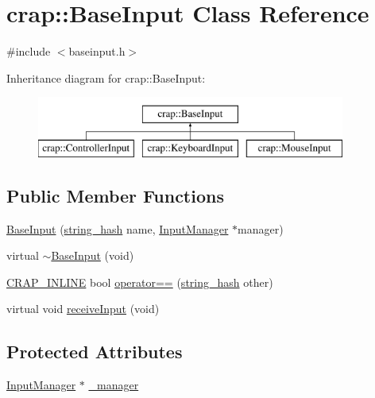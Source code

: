 \hypertarget{classcrap_1_1_base_input}{}\section{crap\+:\+:Base\+Input Class Reference}
\label{classcrap_1_1_base_input}


{\ttfamily \#include $<$baseinput.\+h$>$}

Inheritance diagram for crap\+:\+:Base\+Input\+:\begin{figure}[H]
\begin{center}
\leavevmode
\includegraphics[height=2.000000cm]{classcrap_1_1_base_input}
\end{center}
\end{figure}
\subsection*{Public Member Functions}
\begin{DoxyCompactItemize}
\item 
\hyperlink{classcrap_1_1_base_input_a8db98f74104d1439fc40baab8e0d46f9}{Base\+Input} (\hyperlink{classcrap_1_1string__hash}{string\+\_\+hash} name, \hyperlink{classcrap_1_1_input_manager}{Input\+Manager} $\ast$manager)
\item 
virtual \hyperlink{classcrap_1_1_base_input_aa728dde5e884ccc9ca9a0f7500ed80b6}{$\sim$\+Base\+Input} (void)
\item 
\hyperlink{config__x86_8h_a5a40526b8d842e7ff731509998bb0f1c}{C\+R\+A\+P\+\_\+\+I\+N\+L\+I\+N\+E} bool \hyperlink{classcrap_1_1_base_input_ae0313c39d8de2daf07f7894b2a977f41}{operator==} (\hyperlink{classcrap_1_1string__hash}{string\+\_\+hash} other)
\item 
virtual void \hyperlink{classcrap_1_1_base_input_afa79d7fec307c444c0cf1463a9bd479a}{receive\+Input} (void)
\end{DoxyCompactItemize}
\subsection*{Protected Attributes}
\begin{DoxyCompactItemize}
\item 
\hyperlink{classcrap_1_1_input_manager}{Input\+Manager} $\ast$ \hyperlink{classcrap_1_1_base_input_aaeaae2bbaa8ada09edec80dbe8872c38}{\+\_\+manager}
\end{DoxyCompactItemize}


